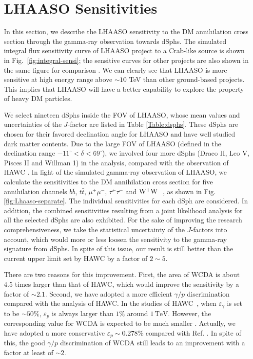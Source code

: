 \documentclass[12pt,aps,prd,amsmath,amssymb,showpacs,floats,floatfix,nofootinbib]{revtex4-1}
\def\TeV{\mathrm{TeV}} %
\begin{document}
\section{LHAASO Sensitivities}\label{sec:dm-limit}
In this section, we describe the LHAASO sensitivity to the DM annihilation cross section through the gamma-ray observation towards dSphs.
The simulated integral flux sensitivity curve of LHAASO project to a Crab-like source is shown in Fig.~\ref{fig:integral-sensi}; the sensitive curves for other projects are also shown in the same figure for comparison \cite{Cao:2014rla}.
We can clearly see that LHAASO is more sensitive at high energy range above $\sim 10$ TeV than other ground-based projects. This implies that LHAASO will have a better capability to explore the property of heavy DM particles.

We select nineteen dSphs inside the FOV of LHAASO, whose mean values and uncertainties of the $J$-factor are listed in Table \ref{Table:dsphs}. These dSphs are chosen for their favored declination angle for LHAASO and have well studied dark matter contents. Due to the large FOV of LHAASO (defined in the declination range $-11^{\circ}<\delta<69^{\circ}$), we involved four more dSphs (Draco II, Leo V, Pisces II and Willman 1) in the analysis, compared with the observation of HAWC \cite{Albert:2017vtb}. In light of the simulated gamma-ray observation of LHAASO, we calculate the sensitivities to the DM annihilation cross section for five annihilation channels $b\bar{b}$, $t\bar{t}$, $\mu^{+}\mu^{-}$, $\tau^+\tau^-$ and $\rm W^+W^-$, as shown in Fig. \ref{fig:Lhaaso-separate}.
The individual sensitivities for each dSph are considered. In addition, the combined sensitivities resulting from a joint likelihood analysis for all the selected dSphs are also exhibited. For the sake of improving the research comprehensiveness, we take the statistical uncertainty of the $J$-factors into account, which would more or less loosen the sensitivity to the gamma-ray signature from dSphs. In spite of this issue, our result is still better than the current upper limit set by HAWC \cite{Albert:2017vtb} by a factor of $2\sim 5$.


There are two reasons for this improvement.
First, the area of WCDA is about 4.5 times larger than that of HAWC, which would improve the sensitivity by a factor of $\sim2.1$.
Second, we have adopted a more efficient $\gamma/p$ discrimination compared with the analysis of HAWC.
In the studies of HAWC~\cite{Capistran:2015dua,Abeysekara:2017mjj}, when $\varepsilon_\gamma$ is set to be $\sim50\%$, $\varepsilon_p$ is always larger than $1\%$ around $1\,\TeV$.
However, the corresponding value for WCDA is expected to be much smaller \cite{Zha:2017vcs}.
Actually, we have adopted a more conservative $\varepsilon_p\sim0.278\%$ compared with Ref. \cite{Zha:2017vcs}. In spite of this, the good $\gamma/p$ discrimination of WCDA still leads to an improvement with a factor at least of $\sim2$.
\end{document}
